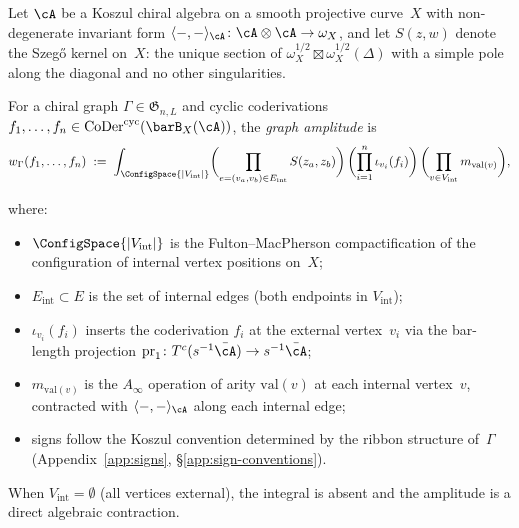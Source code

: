 \begin{definition}\label{def:graph-amplitude}
Let $\cA$ be a Koszul chiral algebra on a smooth projective curve~$X$
with non-degenerate invariant form
$\langle{-},{-}\rangle_{\cA}\colon \cA\otimes\cA\to\omega_X$,
and let $S(z,w)$ denote the Szeg\H{o} kernel on~$X$: the unique
section of
$\omega_X^{1/2} \boxtimes \omega_X^{1/2}(\Delta)$
with a simple pole along the diagonal and no other singularities.

For a chiral graph $\Gamma \in \mathfrak{G}_{n,L}$ and cyclic
coderivations $f_1, \ldots, f_n \in
\operatorname{CoDer}^{\mathrm{cyc}}(\barB_X(\cA))$, the
\emph{graph amplitude} is
\begin{equation}\label{eq:graph-amplitude}
w_\Gamma(f_1, \ldots, f_n)
\;:=\;
\int_{\ConfigSpace{|V_{\mathrm{int}}|}}
\biggl(\prod_{e = (v_a, v_b) \in E_{\mathrm{int}}}
  S(z_a, z_b)\biggr)
\,\biggl(\prod_{i=1}^{n} \iota_{v_i}(f_i)\biggr)
\,\biggl(\prod_{v \in V_{\mathrm{int}}} m_{\mathrm{val}(v)}\biggr),
\end{equation}

where:

\begin{itemize}
\item $\ConfigSpace{|V_{\mathrm{int}}|}$ is the Fulton--MacPherson
  compactification of the configuration of internal vertex positions
  on~$X$;
\item $E_{\mathrm{int}} \subset E$ is the set of internal edges
  (both endpoints in $V_{\mathrm{int}}$);
\item $\iota_{v_i}(f_i)$ inserts the coderivation $f_i$ at the
  external vertex~$v_i$ via the bar-length projection
  $\operatorname{pr}_1\colon T^c(s^{-1}\bar{\cA}) \to
  s^{-1}\bar{\cA}$;
\item $m_{\mathrm{val}(v)}$ is the $A_\infty$ operation of
  arity $\mathrm{val}(v)$ at each internal vertex~$v$, contracted
  with $\langle{-},{-}\rangle_{\cA}$ along each internal edge;
\item signs follow the Koszul convention determined by the ribbon
  structure of~$\Gamma$
  (Appendix~\ref{app:signs}, \S\ref{app:sign-conventions}).
\end{itemize}
When $V_{\mathrm{int}} = \emptyset$ (all vertices external), the
integral is absent and the amplitude is a direct algebraic contraction.
\end{definition}

